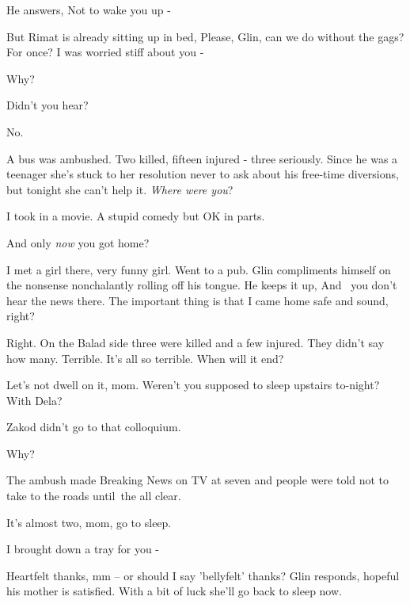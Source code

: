 \documentclass[letterpaper]{article}
\begin{document}
He answers, {\textquotedbl}Not to wake you up -{\textquotedbl} 

But Rimat is already sitting up in bed, {\textquotedbl}Please, Glin, can we do without the gags? For once? I was worried
stiff about you -{\textquotedbl} 

{\textquotedbl}Why?{\textquotedbl} 

{\textquotedbl}Didn't you hear?{\textquotedbl} 

{\textquotedbl}No.{\textquotedbl} 

{\textquotedbl}A bus was ambushed. Two killed, fifteen injured - three seriously.{\textquotedbl} Since he was a teenager
she's stuck to her resolution never{ }to ask about his
free{{}-}time diversions, but tonight she can't help it.
{\textquotedbl}\textit{Where were you}?{\textquotedbl} 

{\textquotedbl}I took in a movie. A stupid{ }comedy but OK in
parts.{\textquotedbl} 

{\textquotedbl}And only \textit{now} you got home?{\textquotedbl} ~

{\textquotedbl}I met a girl there, very funny girl. Went to a pub.{\textquotedbl} Glin compliments himself on the
nonsense nonchalantly rolling off his tongue. He keeps it up, {\textquotedbl}And \ you don't hear the news there. The
important thing is that I came home safe and sound, right?{\textquotedbl} 

{\textquotedbl}Right. On the Balad side three were killed and a few injured. They didn't say how many. Terrible. It's
all so terrible. When will it end?{\textquotedbl} 

{\textquotedbl}Let's not dwell on it, mom. Weren't you supposed to sleep upstairs to-night? With Dela?{\textquotedbl} 

{\textquotedbl}Zakod didn't go to that colloquium.{\textquotedbl} 

{\textquotedbl}Why?{\textquotedbl} 

{\textquotedbl}The ambush made Breaking News on TV at seven and people were told not to take to the roads until~the all
clear.{\textquotedbl} 

{\textquotedbl}It's almost two, mom, go to sleep.{\textquotedbl} 

{\textquotedbl}I brought down a tray for you -{\textquotedbl} 

{\textquotedbl}Heartfelt thanks, mm -- or should I say 'bellyfelt' thanks?{\textquotedbl} Glin responds, hopeful his
mother is satisfied. With a bit of luck she'll go back to sleep now.
\end{document}
